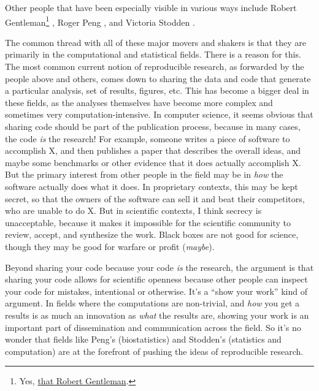 \documentclass{book}
\begin{document}
Other people that have been especially visible in various ways include Robert Gentleman\footnote{Yes, \href{http://www.r-project.org/}{that Robert Gentleman}.
 } \parencite[e.g.,][]{gentleman2004statistical, gentleman2005reproducible}, Roger Peng \parencite[e.g.,][]{peng2009reproducible, peng2008caching, }, and Victoria Stodden \parencite[e.g.,][]{stodden2009enabling, stodden2010reproducible, stodden2011trust, stodden2012reproducible}.

The common thread with all of these major movers and shakers is that they are primarily in the computational and statistical fields. There is a reason for this. The most common current notion of reproducible research, as forwarded by the people above and others, comes down to sharing the data and code that generate a particular analysis, set of results, figures, etc.  This has become a bigger deal in these fields, as the analyses themselves have become more complex and sometimes very computation-intensive. In computer science, it seems obvious that sharing code should be part of the publication process, because in many cases, the code \emph{is} the research!  For example, someone writes a piece of software to accomplish X, and then publishes a paper that describes the overall ideas, and maybe some benchmarks or other evidence that it does actually accomplish X.  But the primary interest from other people in the field may be in \emph{how} the software actually does what it does. In proprietary contexts, this may be kept secret, so that the owners of the software can sell it and beat their competitors, who are unable to do X.  But in scientific contexts, I think secrecy is unacceptable, because it makes it impossible for the scientific community to review, accept, and synthesize the work.  Black boxes are not good for science, though they may be good for warfare or profit (\emph{maybe}).

Beyond sharing your code because your code \emph{is} the research, the argument is that sharing your code allows for scientific openness because other people can inspect your code for mistakes, intentional or otherwise. It's a ``show your work'' kind of argument. In fields where the computations are non-trivial, and \emph{how} you get a results is as much an innovation as \emph{what} the results are, showing your work is an important part of dissemination and communication across the field. So it's no wonder that fields like Peng's (biostatistics) and Stodden's (statistics and computation) are at the forefront of pushing the ideas of reproducible research.
\end{document}
